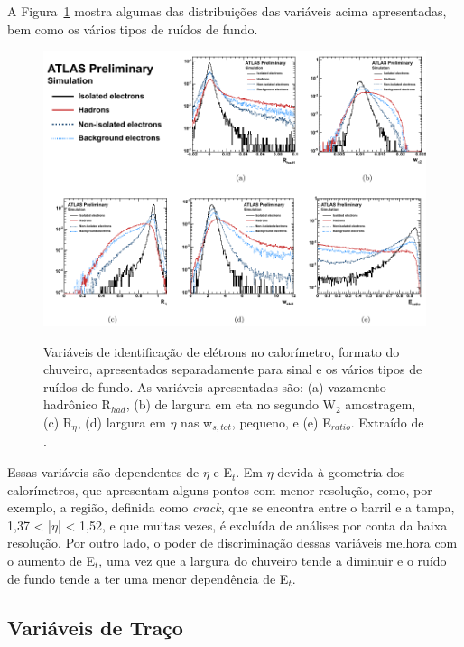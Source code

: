 A Figura~\ref{fig:3T01} mostra algumas das distribuições das variáveis acima apresentadas, bem como os vários tipos de ruídos de fundo.

\begin{figure}[h!]
	\centering
	\includegraphics[width=14cm]{./textuais/identificacao/figuras/fig_1_variaveis_eletron.pdf}\\
	\caption{Variáveis de identificação de elétrons no calorímetro, formato do chuveiro, apresentados separadamente para sinal e os vários tipos de ruídos de fundo. As variáveis apresentadas são: (a) vazamento hadrônico R${_{had}}$, (b) de largura em eta no segundo W${_2}$ amostragem, (c) R${_\eta}$, (d) largura em $\eta$ nas w${_{s,tot}}$, pequeno, e (e) E${_{ratio}}$. Extraído de \cite{alison2014road}.}
	\label{fig:3T01}
\end{figure}

Essas variáveis são dependentes de $\eta$ e E${_t}$. Em $\eta$ devida à geometria dos calorímetros, que apresentam alguns pontos com menor resolução, como, por exemplo, a região, definida como \emph{crack}, que se encontra entre o barril e a tampa, 1,37 < |$\eta$| < 1,52, e que muitas vezes, é excluída de análises por conta da baixa resolução. Por outro lado, o poder de discriminação dessas variáveis melhora com o aumento de E${_t}$, uma vez que a largura do chuveiro tende a diminuir e o ruído de fundo tende a ter uma menor dependência de E${_t}$.

\subsection{Variáveis de Traço} \label{sec:variaveis_traço}

